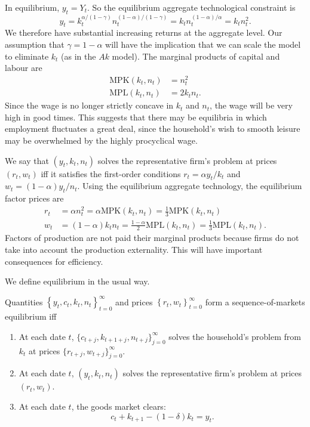 \documentclass[11pt,letterpaper,reqno,oneside]{article}
\begin{document}
In equilibrium, $y_t = Y_t$. So the equilibrium aggregate technological constraint is
%
\begin{equation*}
	y_t 
	= k_t^{\alpha/(1-\gamma)} n_t^{(1-\alpha)/(1-\gamma)}
	= k_t n_t^{(1-\alpha)/\alpha}
	= k_t n_t^2 .
\end{equation*}
%
We therefore have substantial increasing returns at the aggregate level. Our assumption that $\gamma=1-\alpha$ will have the implication that we can scale the model to eliminate $k_t$ (as in the $Ak$ model). The marginal products of capital and labour are
%
\begin{align*}
	\text{MPK}(k_t,n_t)
	&= n_t^2
	\\
	\text{MPL}(k_t,n_t)
	&= 2 k_t n_t .
\end{align*}
%
Since the wage is no longer strictly concave in $k_t$ and $n_t$, the wage will be very high in good times. This suggests that there may be equilibria in which employment fluctuates a great deal, since the household's wish to smooth leisure may be overwhelmed by the highly procyclical wage.

We say that $(y_t,k_t,n_t)$ solves the representative firm's problem at prices $(r_t,w_t)$ iff it satisfies the first-order conditions $r_t = \alpha y_t / k_t$ and $w_t = (1-\alpha) y_t / n_t$. Using the equilibrium aggregate technology, the equilibrium factor prices are
%
\begin{align*}
	r_t 
	&= \alpha n_t^2
	= \alpha \text{MPK}(k_t,n_t)
	= \tfrac{1}{3} \text{MPK}(k_t,n_t)
	\\
	w_t 
	&= (1-\alpha) k_t n_t 
	= \tfrac{1-\alpha}{2} \text{MPL}(k_t,n_t) 
	= \tfrac{1}{3} \text{MPL}(k_t,n_t) .
\end{align*}
%
Factors of production are not paid their marginal products because firms do not take into account the production externality. This will have important consequences for efficiency.


We define equilibrium in the usual way.
%
\begin{definition}
	Quantities $\left\{ y_t, c_t, k_t, n_t \right\}_{t=0}^\infty$ and prices $\left\{ r_t, w_t \right\}_{t=0}^\infty$ form a sequence-of-markets equilibrium iff
	\begin{enumerate}
		
		\item At each date $t$, $\{ c_{t+j}, k_{t+1+j}, n_{t+j} \}_{j=0}^\infty$ solves the household's problem from $k_t$ at prices $\{ r_{t+j}, w_{t+j} \}_{j=0}^\infty$.

		\item At each date $t$, $(y_t,k_t,n_t)$ solves the representative firm's problem at prices $(r_t,w_t)$.

		\item At each date $t$, the goods market clears:
		\begin{equation*}
			c_t + k_{t+1} - (1-\delta) k_t = y_t .
		\end{equation*}

	\end{enumerate}
\end{definition}
\end{document}
